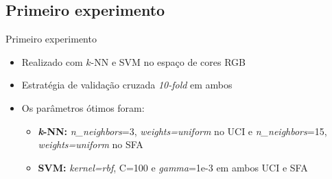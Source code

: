 \subsection{Primeiro experimento}
\begin{frame}{Primeiro experimento}
  \begin{itemize}
      \item Realizado com $k$-NN e SVM no espaço de cores RGB
      \item Estratégia de validação cruzada \emph{10-fold} em ambos
      \item Os parâmetros ótimos foram:
      \begin{itemize}
          \item \textbf{\emph{k}-NN:} \emph{n\_neighbors}=3, \emph{weights=uniform} no UCI e \emph{n\_neighbors}=15, \emph{weights=uniform} no SFA
          \item \textbf{SVM:} \emph{kernel=rbf}, C=100 e \emph{gamma}=1e-3 em ambos UCI e SFA
      \end{itemize}
  \end{itemize}
\end{frame}

